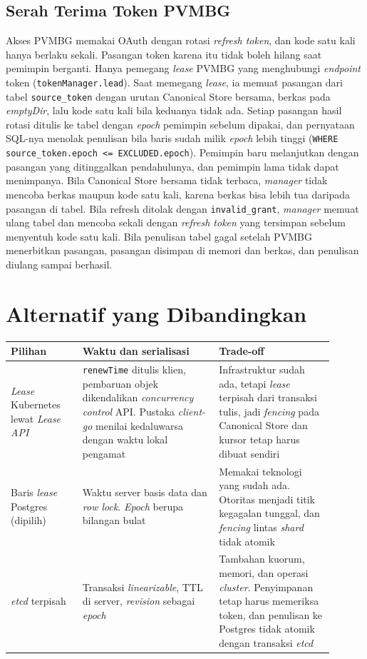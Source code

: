 \subsection{Serah Terima Token PVMBG}

Akses PVMBG memakai OAuth dengan rotasi \textit{refresh token}, dan kode satu kali hanya berlaku sekali. Pasangan token karena itu tidak boleh hilang saat pemimpin berganti. Hanya pemegang \textit{lease} PVMBG yang menghubungi \textit{endpoint} token (\texttt{tokenManager.lead}). Saat memegang \textit{lease}, ia memuat pasangan dari tabel \texttt{source\_token} dengan urutan Canonical Store bersama, berkas pada \textit{emptyDir}, lalu kode satu kali bila keduanya tidak ada. Setiap pasangan hasil rotasi ditulis ke tabel dengan \textit{epoch} pemimpin sebelum dipakai, dan pernyataan SQL-nya menolak penulisan bila baris sudah milik \textit{epoch} lebih tinggi (\texttt{WHERE source\_token.epoch <= EXCLUDED.epoch}). Pemimpin baru melanjutkan dengan pasangan yang ditinggalkan pendahulunya, dan pemimpin lama tidak dapat menimpanya. Bila Canonical Store bersama tidak terbaca, \textit{manager} tidak mencoba berkas maupun kode satu kali, karena berkas bisa lebih tua daripada pasangan di tabel. Bila refresh ditolak dengan \texttt{invalid\_grant}, \textit{manager} memuat ulang tabel dan mencoba sekali dengan \textit{refresh token} yang tersimpan sebelum menyentuh kode satu kali. Bila penulisan tabel gagal setelah PVMBG menerbitkan pasangan, pasangan disimpan di memori dan berkas, dan penulisan diulang sampai berhasil.

\section{Alternatif yang Dibandingkan}

\begin{longtable}[]{|>{\raggedright\arraybackslash}p{0.2\linewidth}|>{\raggedright\arraybackslash}p{0.38\linewidth}|>{\raggedright\arraybackslash}p{0.32\linewidth}|}
\hline
\textbf{Pilihan} & \textbf{Waktu dan serialisasi} & \textbf{Trade-off} \\
\hline
\endhead
\textit{Lease} Kubernetes lewat \textit{Lease API} & \texttt{renewTime} ditulis klien, pembaruan objek dikendalikan \textit{concurrency control} API. Pustaka \textit{client-go} menilai kedaluwarsa dengan waktu lokal pengamat & Infrastruktur sudah ada, tetapi \textit{lease} terpisah dari transaksi tulis, jadi \textit{fencing} pada Canonical Store dan kursor tetap harus dibuat sendiri \\
\hline
Baris \textit{lease} Postgres (dipilih) & Waktu server basis data dan \textit{row lock}. \textit{Epoch} berupa bilangan bulat & Memakai teknologi yang sudah ada. Otoritas menjadi titik kegagalan tunggal, dan \textit{fencing} lintas \textit{shard} tidak atomik \\
\hline
\textit{etcd} terpisah & Transaksi \textit{linearizable}, TTL di server, \textit{revision} sebagai \textit{epoch} & Tambahan kuorum, memori, dan operasi \textit{cluster}. Penyimpanan tetap harus memeriksa token, dan penulisan ke Postgres tidak atomik dengan transaksi \textit{etcd} \\
\hline
\end{longtable}

